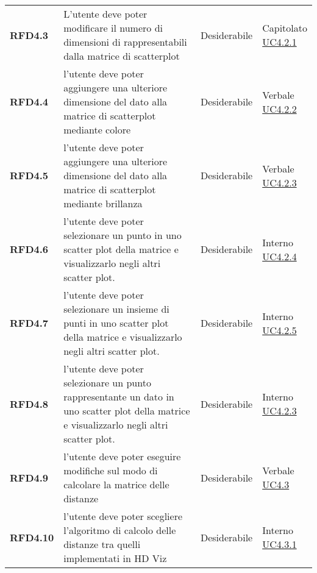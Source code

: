 \begin{longtable}[H]{>{\raggedright\bfseries}m{20mm} >{\raggedright}m{90mm} >{\raggedright}m{28mm} >{\raggedright\arraybackslash}m{30mm}}
    RFD4.3
    & L'utente deve poter modificare il numero di dimensioni di rappresentabili dalla matrice di scatterplot
    & Desiderabile
    & \makecell{ Capitolato \\ \hyperref[par:uc4.2.1]{UC4.2.1} }\\

    RFD4.4
    & l'utente deve poter aggiungere una ulteriore dimensione del dato alla matrice di scatterplot mediante colore
    & Desiderabile
    & \makecell{ Verbale \\ \hyperref[par:uc4.2.2]{UC4.2.2} }\\

    RFD4.5
    & l'utente deve poter aggiungere una ulteriore dimensione del dato alla matrice di scatterplot mediante brillanza
    & Desiderabile
    & \makecell{ Verbale \\ \hyperref[par:uc4.2.3]{UC4.2.3} }\\

    RFD4.6
    & l'utente deve poter selezionare un punto in uno scatter plot della matrice e visualizzarlo negli altri scatter plot.
    & Desiderabile
    & \makecell{ Interno \\ \hyperref[par:uc4.2.4]{UC4.2.4} }\\

    RFD4.7
    & l'utente deve poter selezionare un insieme di punti in uno scatter plot della matrice e visualizzarlo negli altri scatter plot.
    & Desiderabile
    & \makecell{ Interno \\ \hyperref[par:uc4.2.5]{UC4.2.5} }\\

    RFD4.8
    & l'utente deve poter selezionare un punto rappresentante un dato in uno scatter plot della matrice e visualizzarlo negli altri scatter plot.
    & Desiderabile
    & \makecell{ Interno \\ \hyperref[par:uc4.2.3]{UC4.2.3} }\\

    RFD4.9
    & l'utente deve poter eseguire modifiche sul modo di calcolare la matrice delle distanze
    & Desiderabile
    & \makecell{ Verbale \\ \hyperref[ssub:uc4.3]{UC4.3} }\\

    RFD4.10
    & l'utente deve poter scegliere l'algoritmo di calcolo delle distanze tra quelli implementati in HD Viz
    & Desiderabile
    & \makecell{ Interno \\ \hyperref[par:uc4.3.1]{UC4.3.1} }\\


\end{longtable}

